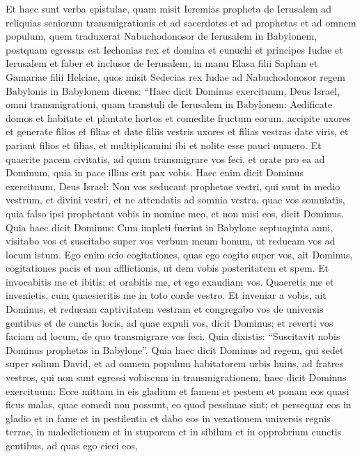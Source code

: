 \begin{biblechapter}  
\verse Et haec sunt verba epistulae, quam misit Ieremias propheta de Ierusalem ad reliquias seniorum transmigrationis et ad sacerdotes et ad prophetas et ad omnem populum, quem traduxerat Nabuchodonosor de Ierusalem in Babylonem, 
\verse postquam egressus est Iechonias rex et domina et eunuchi et principes Iudae et Ierusalem et faber et inclusor de Ierusalem, 
\verse in manu Elasa filii Saphan et Gamariae filii Helciae, quos misit Sedecias rex Iudae ad Nabuchodonosor regem Babylonis in Babylonem dicens: 
\verse “Haec dicit Dominus exercituum, Deus Israel, omni transmigrationi, quam transtuli de Ierusalem in Babylonem: 
\verse Aedificate domos et habitate et plantate hortos et comedite fructum eorum, 
\verse accipite uxores et generate filios et filias et date filiis vestris uxores et filias vestras date viris, et pariant filios et filias, et multiplicamini ibi et nolite esse pauci numero.  
\verse Et quaerite pacem civitatis, ad quam transmigrare vos feci, et orate pro ea ad Dominum, quia in pace illius erit pax vobis. 
\verse Haec enim dicit Dominus exercituum, Deus Israel: Non vos seducant prophetae vestri, qui sunt in medio vestrum, et divini vestri, et ne attendatis ad somnia vestra, quae vos somniatis, 
\verse quia falso ipsi prophetant vobis in nomine meo, et non misi eos, dicit Dominus. 
\verse Quia haec dicit Dominus: Cum impleti fuerint in Babylone septuaginta anni, visitabo vos et suscitabo super vos verbum meum bonum, ut reducam vos ad locum istum. 
\verse Ego enim scio cogitationes, quas ego cogito super vos, ait Dominus, cogitationes pacis et non afflictionis, ut dem vobis posteritatem et spem. 
\verse Et invocabitis me et ibitis; et orabitis me, et ego exaudiam vos. 
\verse Quaeretis me et invenietis, cum quaesieritis me in toto corde vestro. 
\verse Et inveniar a vobis, ait Dominus, et reducam captivitatem vestram et congregabo vos de universis gentibus et de cunctis locis, ad quae expuli vos, dicit Dominus; et reverti vos faciam ad locum, de quo transmigrare vos feci. 
\verse Quia dixistis: “Suscitavit nobis Dominus prophetas in Babylone”. 
\verse Quia haec dicit Dominus ad regem, qui sedet super solium David, et ad omnem populum habitatorem urbis huius, ad fratres vestros, qui non sunt egressi vobiscum in transmigrationem, 
\verse haec dicit Dominus exercituum: Ecce mittam in eis gladium et famem et pestem et ponam eos quasi ficus malas, quae comedi non possunt, eo quod pessimae sint; 
\verse et persequar eos in gladio et in fame et in pestilentia et dabo eos in vexationem universis regnis terrae, in maledictionem et in stuporem et in sibilum et in opprobrium cunctis gentibus, ad quas ego eieci eos, 

\end{biblechapter}

